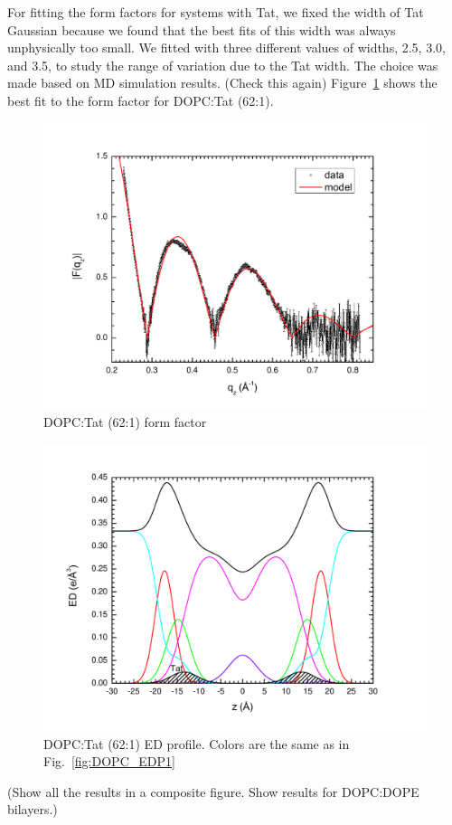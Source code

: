 \documentclass[12pt,letterpaper]{article}
\begin{document}
For fitting the form factors for systems with Tat, we fixed the width of Tat 
Gaussian because we found that the best fits of this width was always 
unphysically too small. We fitted with three different values of widths,
2.5, 3.0, and 3.5, to study the range of variation due to the Tat width. 
The choice was made based on MD simulation results. (Check this again)
Figure~\ref{fig:DOPC_Tat_62to1_3.0_XFF1} shows the best fit to the 
form factor for DOPC:Tat (62:1). 
\begin{figure}[htbp]
  \centering
  \includegraphics[scale=0.3]{./figures/SDP_Results/DOPC_Tat_62to1_3_XFF1.pdf}
  \caption{DOPC:Tat (62:1) form factor}
  \label{fig:DOPC_Tat_62to1_3.0_XFF1}
\end{figure}
\begin{figure}[htbp]
  \centering
  \includegraphics[scale=0.3]{./figures/SDP_Results/DOPC_Tat_62to1_3_EDP1.pdf}
  \caption{DOPC:Tat (62:1) ED profile. Colors are the same as in 
  Fig.~\ref{fig:DOPC_EDP1}}
  \label{fig:DOPC_Tat_62to1_3.0_EDP1}
\end{figure}
(Show all the results in a composite figure. Show results for DOPC:DOPE bilayers.)
\end{document}
